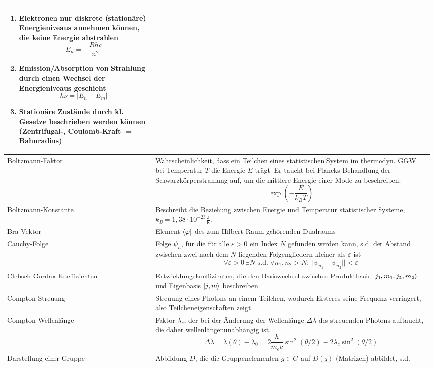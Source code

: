 \documentclass{article}
\newcommand{\lr}[1]{\left(#1\right)}
\begin{document}
\begin{xltabular}{\linewidth}{l|X}
		 {\begin{enumerate}
		 	\item Elektronen nur diskrete (\textbf{stationäre}) Energieniveaus annehmen können, die keine Energie abstrahlen
		 		$$E_n = -\frac{R h c}{n^2}$$
		 	\item Emission/Absorption von Strahlung durch einen Wechsel der Energieniveaus geschieht
		 		$$h \nu = |E_n - E_m|$$
		 	\item Stationäre Zustände durch kl. Gesetze beschrieben werden können (Zentrifugal-, Coulomb-Kraft $\Rightarrow$ Bahnradius)
		 \end{enumerate}} \\
	\hline
		Boltzmann-Faktor & Wahrscheinlichkeit, dass ein Teilchen eines statistischen System im thermodyn. GGW bei Temperatur $T$ die Energie $E$ trägt. Er taucht bei Plancks Behandlung der Schwarzkörperstrahlung auf, um die mittlere Energie einer Mode zu beschreiben.
			$$\exp\lr{-\frac{E}{k_B T}}$$ \\
	\hline
		Boltzmann-Konstante & Beschreibt die Beziehung zwischen Energie und Temperatur statistischer Systeme, $k_B = 1,38\cdot 10^{-23}\frac{\text{J}}{\text{K}}$. \\
	\hline
		Bra-Vektor & Element $\bra{\varphi}$ des zum Hilbert-Raum gehörenden Dualraums \\
	\hline
		Cauchy-Folge & Folge $\psi_n$, für die für alle $\varepsilon > 0$ ein Index $N$ gefunden werden kann, s.d. der Abstand zwischen zwei nach dem $N$ liegenden Folgengliedern kleiner als $\varepsilon$ ist
			$$\forall\varepsilon > 0\ \exists N \text{ s.d. } \forall n_1,n_2 > N: ||\psi_{n_1} - \psi_{n_2}|| < \varepsilon$$\\
	\hline
		Clebsch-Gordan-Koeffizienten & Entwicklungskoeffizienten, die den Basiswechsel zwischen Produktbasis $\ket{j_1, m_1, j_2, m_2}$ und Eigenbasis $\ket{j,m}$ beschreiben \\
	\hline
		Compton-Streuung & Streuung eines Photons an einem Teilchen, wodurch Ersteres seine Frequenz verringert, also Teilcheneigenschaften zeigt.\\
	\hline
		Compton-Wellenlänge & Faktor $\lambda_c$, der bei der Änderung der Wellenlänge $\Delta \lambda$ des streuenden Photons auftaucht, die daher wellenlängenunabhängig ist.
			$$\Delta\lambda = \lambda(\theta) - \lambda_0 = 2\frac{h}{m_e c}\sin^2(\theta/2) \equiv 2\lambda_c \sin^2(\theta/2)$$\\
	\hline
		Darstellung einer Gruppe & Abbildung $D$, die die Gruppenelementen $g\in G$ auf $D(g)$ (Matrizen) abbildet, s.d.

\end{xltabular}
\end{document}
